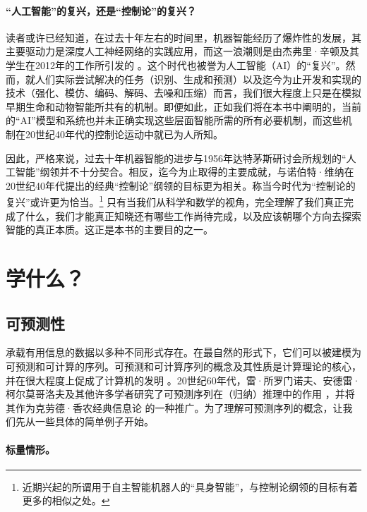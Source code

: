 \documentclass[../../book-main.tex]{subfiles}
\begin{document}
\paragraph{“人工智能”的复兴，还是“控制论”的复兴？}
读者或许已经知道，在过去十年左右的时间里，机器智能经历了爆炸性的发展，其主要驱动力是深度人工神经网络的实践应用，而这一浪潮则是由杰弗里·辛顿及其学生在2012年的工作所引发的 \cite{krizhevsky2012imagenet}。这个时代也被誉为人工智能（AI）的“复兴”。然而，就人们实际尝试解决的任务（识别、生成和预测）以及迄今为止开发和实现的技术（强化、模仿、编码、解码、去噪和压缩）而言，我们很大程度上只是在模拟早期生命和动物智能所共有的机制。即便如此，正如我们将在本书中阐明的，当前的“AI”模型和系统也并未正确实现这些层面智能所需的所有必要机制，而这些机制在20世纪40年代的控制论运动中就已为人所知。

因此，严格来说，过去十年机器智能的进步与1956年达特茅斯研讨会所规划的“人工智能”纲领并不十分契合。相反，迄今为止取得的主要成就，与诺伯特·维纳在20世纪40年代提出的经典“控制论”纲领的目标更为相关。称当今时代为“控制论的复兴”或许更为恰当。\footnote{近期兴起的所谓用于自主智能机器人的“具身智能”，与控制论纲领的目标有着更多的相似之处。} 只有当我们从科学和数学的视角，完全理解了我们真正完成了什么，我们才能真正知晓还有哪些工作尚待完成，以及应该朝哪个方向去探索智能的真正本质。这正是本书的主要目的之一。


\section{学什么？}
\label{sec:what-to-learn}



\subsection{可预测性}
\label{sec:predictability}
承载有用信息的数据以多种不同形式存在。在最自然的形式下，它们可以被建模为可预测和可计算的序列。可预测和可计算序列的概念及其性质是计算理论的核心，并在很大程度上促成了计算机的发明 \cite{Turing-1936}。20世纪60年代，雷·所罗门诺夫、安德雷·柯尔莫哥洛夫及其他许多学者研究了可预测序列在（归纳）推理中的作用 \cite{Kolmogorov1998OnTO}，并将其作为克劳德·香农经典信息论 \cite{Shannon-1948} 的一种推广。为了理解可预测序列的概念，让我们先从一些具体的简单例子开始。
\paragraph{标量情形。}
\end{document}
